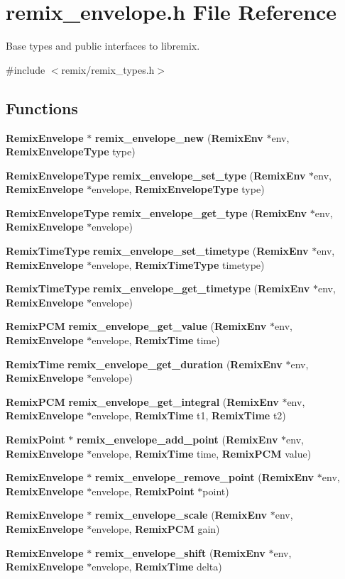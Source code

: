 \section{remix\_\-envelope.h File Reference}
\label{remix__envelope_8h}


Base types and public interfaces to libremix.  


{\ttfamily \#include $<$remix/remix\_\-types.h$>$}\par
\subsection*{Functions}
\begin{DoxyCompactItemize}
\item 
{\bf RemixEnvelope} $\ast$ {\bf remix\_\-envelope\_\-new} ({\bf RemixEnv} $\ast$env, {\bf RemixEnvelopeType} type)
\item 
{\bf RemixEnvelopeType} {\bf remix\_\-envelope\_\-set\_\-type} ({\bf RemixEnv} $\ast$env, {\bf RemixEnvelope} $\ast$envelope, {\bf RemixEnvelopeType} type)
\item 
{\bf RemixEnvelopeType} {\bf remix\_\-envelope\_\-get\_\-type} ({\bf RemixEnv} $\ast$env, {\bf RemixEnvelope} $\ast$envelope)
\item 
{\bf RemixTimeType} {\bf remix\_\-envelope\_\-set\_\-timetype} ({\bf RemixEnv} $\ast$env, {\bf RemixEnvelope} $\ast$envelope, {\bf RemixTimeType} timetype)
\item 
{\bf RemixTimeType} {\bf remix\_\-envelope\_\-get\_\-timetype} ({\bf RemixEnv} $\ast$env, {\bf RemixEnvelope} $\ast$envelope)
\item 
{\bf RemixPCM} {\bf remix\_\-envelope\_\-get\_\-value} ({\bf RemixEnv} $\ast$env, {\bf RemixEnvelope} $\ast$envelope, {\bf RemixTime} time)
\item 
{\bf RemixTime} {\bf remix\_\-envelope\_\-get\_\-duration} ({\bf RemixEnv} $\ast$env, {\bf RemixEnvelope} $\ast$envelope)
\item 
{\bf RemixPCM} {\bf remix\_\-envelope\_\-get\_\-integral} ({\bf RemixEnv} $\ast$env, {\bf RemixEnvelope} $\ast$envelope, {\bf RemixTime} t1, {\bf RemixTime} t2)
\item 
{\bf RemixPoint} $\ast$ {\bf remix\_\-envelope\_\-add\_\-point} ({\bf RemixEnv} $\ast$env, {\bf RemixEnvelope} $\ast$envelope, {\bf RemixTime} time, {\bf RemixPCM} value)
\item 
{\bf RemixEnvelope} $\ast$ {\bf remix\_\-envelope\_\-remove\_\-point} ({\bf RemixEnv} $\ast$env, {\bf RemixEnvelope} $\ast$envelope, {\bf RemixPoint} $\ast$point)
\item 
{\bf RemixEnvelope} $\ast$ {\bf remix\_\-envelope\_\-scale} ({\bf RemixEnv} $\ast$env, {\bf RemixEnvelope} $\ast$envelope, {\bf RemixPCM} gain)
\item 
{\bf RemixEnvelope} $\ast$ {\bf remix\_\-envelope\_\-shift} ({\bf RemixEnv} $\ast$env, {\bf RemixEnvelope} $\ast$envelope, {\bf RemixTime} delta)
\end{DoxyCompactItemize}


